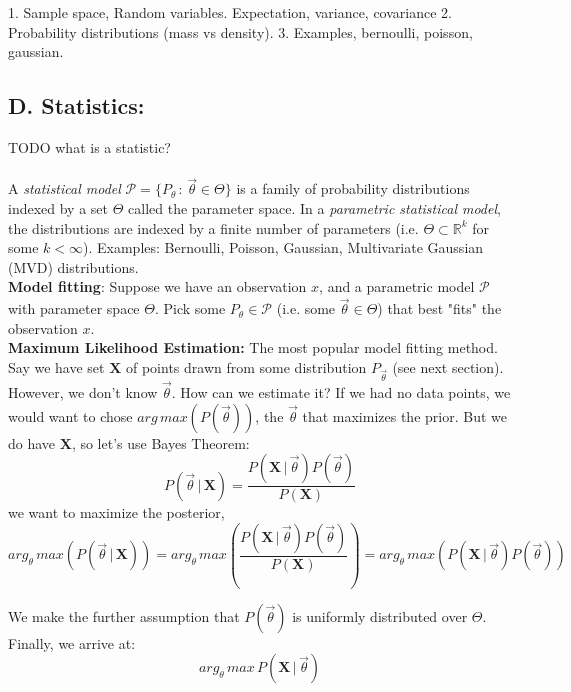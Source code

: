 \documentclass[10pt]{article}
\begin{document}
			1. Sample space, Random variables. Expectation, variance, covariance
			2. Probability distributions (mass vs density). 
			3. Examples, bernoulli, poisson, gaussian.  
							
							
		\subsection*{D. Statistics:}
			TODO what is a statistic? \\ \\
			A \textit{statistical model} $\mathcal{P} = \{ P_\theta \, : \, \vec \theta \in \Theta \}$ is a family of 
			probability distributions indexed by a set $\Theta$ called the parameter space. In a \textit{parametric 
			statistical model}, the distributions are indexed by a finite number of parameters 
			(i.e. $\Theta \subset \mathbb{R}^k$ for some $ k < \infty$). Examples: Bernoulli, Poisson, 
			Gaussian, Multivariate Gaussian (MVD) distributions. \\
			
			\noindent \textbf{Model fitting}: Suppose we have an observation $x$, and a parametric model 
			$\mathcal P$ with parameter space $\Theta$. Pick some $P_\theta \in \mathcal P$ (i.e. some 
			$\vec \theta \in \Theta$) that best "fits" the observation $x$. \\
			
			\noindent \textbf{Maximum Likelihood Estimation:}  The most popular model fitting method.
			Say we have set $\mathbf X$ of points drawn from some distribution $P_{\vec \theta}$ (see 
			next section). However, we don't know $\vec \theta$. How can we estimate it? 	If we had no data points, 
			we would want to chose $arg \, max(P(\vec \theta)) $, the $\vec \theta$ 
			that maximizes the prior. But we do have $\mathbf X$, so let's use Bayes Theorem:
			$$ P(\vec \theta \, | \, \mathbf{X}) = \frac{P(\mathbf{X} \, | \, \vec \theta) P(\vec \theta)}{P(\mathbf X)} $$
			we want to maximize the posterior,
			$$arg_\theta \, max (P(\vec \theta \, | \, \mathbf{X})) = 
			arg_\theta \, max (\frac{P(\mathbf{X} \, | \, \vec \theta)P(\vec \theta)}{P(\mathbf{X})}) = 
			arg_\theta \, max(P(\mathbf{X} \, | \, \vec \theta)P(\vec \theta)) $$
				
			\noindent We make the further assumption that $P(\vec \theta)$ is uniformly distributed over $\Theta$. 
			Finally, we arrive at:
			$$arg_\theta \, max \, P(\mathbf{X} \, | \, \vec \theta) $$ 
			
\end{document}
